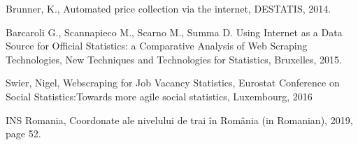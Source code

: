 \documentclass[]{article}
\begin{document}
\begin{thebibliography}{99}
Brunner, K., 
Automated price collection via the internet, 
DESTATIS, 2014.

Barcaroli G., Scannapieco M., Scarno M., Summa D. 
Using Internet as a Data Source for Official Statistics: a Comparative Analysis of Web Scraping Technologies,
New Techniques and Technologies for Statistics, Bruxelles, 2015.

Swier, Nigel, 
Webscraping for Job Vacancy Statistics, 
Eurostat Conference on Social Statistics:Towards more agile social statistics, Luxembourg,
2016

INS Romania, Coordonate ale nivelului de trai în România (in Romanian), 2019, page 52.

\end{thebibliography}
\end{document}

